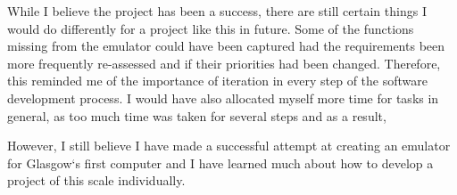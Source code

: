 \documentclass{l4proj}
\begin{document}
While I believe the project has been a success, there are still certain things I would do differently for a project like this in future. Some of the functions missing from the emulator could have been captured had the requirements been more frequently re-assessed and if their priorities had been changed. Therefore, this reminded me of the importance of iteration in every step of the software development process. I would have also allocated myself more time for tasks in general, as too much time was taken for several steps and as a result, 

However, I still believe I have made a successful attempt at creating an emulator for Glasgow`s first computer and I have learned much about how to develop a project of this scale individually. 


%
% 
\end{document}

